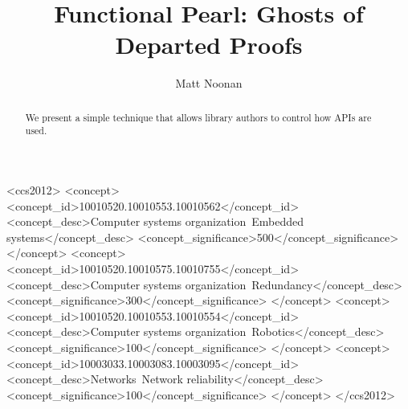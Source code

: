 \documentclass[format=sigplan, review=false, screen=true]{acmart}
\begin{document}
\title[Ghosts of Departed Proofs]{Functional Pearl: Ghosts of Departed Proofs}

\author{Matt Noonan}


\begin{abstract}

  We present a simple technique that allows library authors to
  control how APIs are used.

\end{abstract}


%
%
\begin{CCSXML}
<ccs2012>
 <concept>
  <concept_id>10010520.10010553.10010562</concept_id>
  <concept_desc>Computer systems organization~Embedded systems</concept_desc>
  <concept_significance>500</concept_significance>
 </concept>
 <concept>
  <concept_id>10010520.10010575.10010755</concept_id>
  <concept_desc>Computer systems organization~Redundancy</concept_desc>
  <concept_significance>300</concept_significance>
 </concept>
 <concept>
  <concept_id>10010520.10010553.10010554</concept_id>
  <concept_desc>Computer systems organization~Robotics</concept_desc>
  <concept_significance>100</concept_significance>
 </concept>
 <concept>
  <concept_id>10003033.10003083.10003095</concept_id>
  <concept_desc>Networks~Network reliability</concept_desc>
  <concept_significance>100</concept_significance>
 </concept>
</ccs2012>
\end{CCSXML}


%
%






\maketitle
\end{document}
